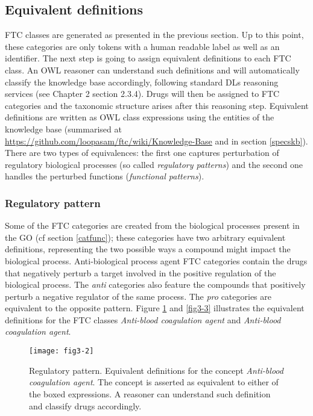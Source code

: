 \subsection{Equivalent definitions}
FTC classes are generated as presented in the previous section. Up to this point, these categories are only tokens with a human readable label as well as an identifier. The next step is going to assign equivalent definitions to each FTC class. An OWL reasoner can understand such definitions and will automatically classify the knowledge base accordingly, following standard DLs reasoning services (see Chapter 2 section 2.3.4).
Drugs will then be assigned to FTC categories and the taxonomic structure arises after this reasoning step. Equivalent definitions are written as OWL class expressions using the entities of the knowledge base (summarised at \url{https://github.com/loopasam/ftc/wiki/Knowledge-Base} and in section \ref{specskb}). There are two types of equivalences: the first one captures perturbation of regulatory biological processes (so called \emph{regulatory patterns}) and the second one handles the perturbed functions (\emph{functional patterns}).

\subsubsection{Regulatory pattern}
Some of the FTC categories are created from the biological processes present in the GO (cf section \ref{catfunc}); these categories have two arbitrary equivalent definitions, representing the two possible ways a compound might impact the biological process. Anti-biological process agent FTC categories contain the drugs that negatively perturb a target involved in the positive regulation of the biological process. The \emph{anti} categories also feature the compounds that positively perturb a negative regulator of the same process. The \emph{pro} categories are equivalent to the opposite pattern. Figure \ref{fig3-2} and \ref{fig3-3} illustrates the equivalent definitions for the FTC classes \emph{Anti-blood coagulation agent} and \emph{Anti-blood coagulation agent}.

\begin{figure}[ht]
    \centering
    \texttt{[image: fig3-2]}
    \caption{Regulatory pattern. Equivalent definitions for the concept \emph{Anti-blood coagulation agent}. The concept is asserted as equivalent to either of the boxed expressions. A reasoner can understand such definition and classify drugs accordingly.}
    \label{fig3-2}
\end{figure}


